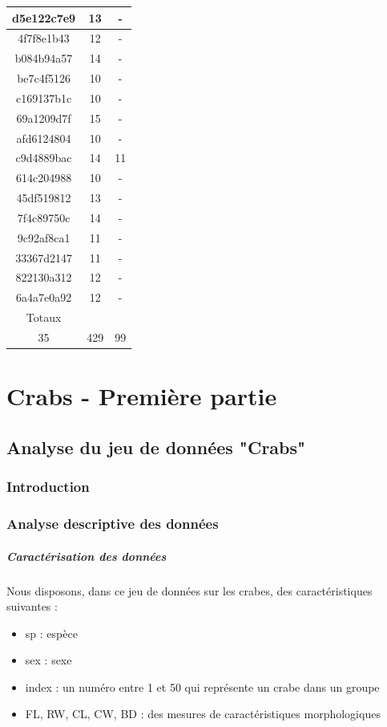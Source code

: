 \documentclass{report}
\begin{document}
\begin{table}[h!]
{\begin{minipage}{\textwidth}
\begin{center}
\begin{tabular}{c|c|c}
    d5e122c7e9 & 13 & -\\
    \hline
    4f7f8e1b43 & 12 & -\\
    \hline
    b084b94a57 & 14 & -\\
    \hline
    be7c4f5126 & 10 & -\\
    \hline
    c169137b1c & 10 & -\\
    \hline
    69a1209d7f & 15 & -\\
    \hline
    afd6124804 & 10 & -\\
    \hline
    c9d4889bac & 14 & 11\\
    \hline
    614c204988 & 10 & -\\
    \hline
    45df519812 & 13 & -\\
    \hline
    7f4c89750c & 14 & -\\
    \hline
    9c92af8ca1 & 11 & -\\
    \hline
    33367d2147 & 11 & -\\
    \hline
    822130a312 & 12 & -\\
    \hline
    6a4a7e0a92 & 12 & -\\
    \hline\hline
    Totaux\\
    \hline
    35 & 429 & 99
    \end{tabular}
    \end{center}
    \end{minipage}}
\end{table}

\newpage
\chapter{Crabs - Première partie}


\section{Analyse du jeu de données "Crabs"}

\subsection{Introduction}

\subsection{Analyse descriptive des données}
\paragraph{Caractérisation des données}
Nous disposons, dans ce jeu de données sur les crabes, des caractéristiques suivantes :
\begin{itemize}
\item sp : espèce
\item sex : sexe
\item index : un numéro entre 1 et 50 qui représente un crabe dans un groupe
\item FL, RW, CL, CW, BD : des mesures de caractéristiques morphologiques
\end{itemize}
\end{document}
